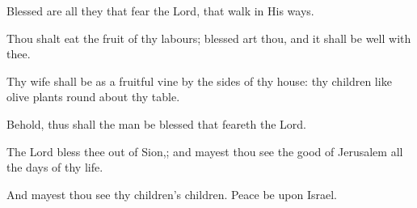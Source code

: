 Blessed are all they that fear the Lord, that walk in His ways.

Thou shalt eat the fruit of thy labours; blessed art thou, and it shall be well with thee.

Thy wife shall be as a fruitful vine by the sides of thy house: thy children like olive plants round about thy table.

Behold, thus shall the man be blessed that feareth the Lord.

The Lord bless thee out of Sion,; and mayest thou see the good of Jerusalem all the days of thy life.

And mayest thou see thy children's children. Peace be upon Israel.
